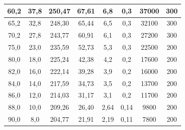 \documentclass[a4paper,12pt,spanish]{article}
\begin{document}
\begin{table}[H]
\begin{tabular}{cccccccc}
			\multicolumn{1}{|c|}{60,2} & \multicolumn{1}{c|}{37,8} & \multicolumn{1}{c|}{250,47} & \multicolumn{1}{c|}{67,61} & \multicolumn{1}{c|}{6,8} & \multicolumn{1}{c|}{0,3} & \multicolumn{1}{c|}{37000} & \multicolumn{1}{c|}{300} \\ \hline
			\multicolumn{1}{|c|}{65,2} & \multicolumn{1}{c|}{32,8} & \multicolumn{1}{c|}{248,30} & \multicolumn{1}{c|}{65,44} & \multicolumn{1}{c|}{6,5} & \multicolumn{1}{c|}{0,3} & \multicolumn{1}{c|}{32100} & \multicolumn{1}{c|}{300} \\ \hline
			\multicolumn{1}{|c|}{70,2} & \multicolumn{1}{c|}{27,8} & \multicolumn{1}{c|}{243,77} & \multicolumn{1}{c|}{60,91} & \multicolumn{1}{c|}{6,1} & \multicolumn{1}{c|}{0,3} & \multicolumn{1}{c|}{27200} & \multicolumn{1}{c|}{300} \\ \hline
			\multicolumn{1}{|c|}{75,0} & \multicolumn{1}{c|}{23,0} & \multicolumn{1}{c|}{235,59} & \multicolumn{1}{c|}{52,73} & \multicolumn{1}{c|}{5,3} & \multicolumn{1}{c|}{0,3} & \multicolumn{1}{c|}{22500} & \multicolumn{1}{c|}{200} \\ \hline
			\multicolumn{1}{|c|}{80,0} & \multicolumn{1}{c|}{18,0} & \multicolumn{1}{c|}{225,24} & \multicolumn{1}{c|}{42,38} & \multicolumn{1}{c|}{4,2} & \multicolumn{1}{c|}{0,2} & \multicolumn{1}{c|}{17600} & \multicolumn{1}{c|}{200} \\ \hline
			\multicolumn{1}{|c|}{82,0} & \multicolumn{1}{c|}{16,0} & \multicolumn{1}{c|}{222,14} & \multicolumn{1}{c|}{39,28} & \multicolumn{1}{c|}{3,9} & \multicolumn{1}{c|}{0,2} & \multicolumn{1}{c|}{16000} & \multicolumn{1}{c|}{200} \\ \hline
			\multicolumn{1}{|c|}{84,0} & \multicolumn{1}{c|}{14,0} & \multicolumn{1}{c|}{217,59} & \multicolumn{1}{c|}{34,73} & \multicolumn{1}{c|}{3,5} & \multicolumn{1}{c|}{0,2} & \multicolumn{1}{c|}{13700} & \multicolumn{1}{c|}{200} \\ \hline
			\multicolumn{1}{|c|}{86,0} & \multicolumn{1}{c|}{12,0} & \multicolumn{1}{c|}{214,03} & \multicolumn{1}{c|}{31,17} & \multicolumn{1}{c|}{3,1} & \multicolumn{1}{c|}{0,2} & \multicolumn{1}{c|}{11700} & \multicolumn{1}{c|}{200} \\ \hline
			\multicolumn{1}{|c|}{88,0} & \multicolumn{1}{c|}{10,0} & \multicolumn{1}{c|}{209,26} & \multicolumn{1}{c|}{26,40} & \multicolumn{1}{c|}{2,64} & \multicolumn{1}{c|}{0,14} & \multicolumn{1}{c|}{9800} & \multicolumn{1}{c|}{200} \\ \hline
			\multicolumn{1}{|c|}{90,0} & \multicolumn{1}{c|}{8,0} & \multicolumn{1}{c|}{204,77} & \multicolumn{1}{c|}{21,91} & \multicolumn{1}{c|}{2,19} & \multicolumn{1}{c|}{0,11} & \multicolumn{1}{c|}{7800} & \multicolumn{1}{c|}{200} \\ \hline

\end{tabular}
\end{table}
\end{document}
